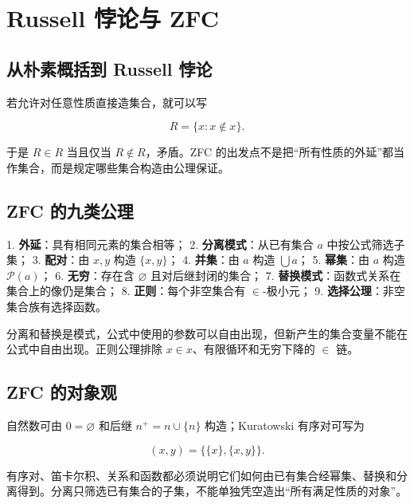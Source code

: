 \section{Russell 悖论与 ZFC}


\subsection{从朴素概括到 Russell 悖论}


若允许对任意性质直接造集合，就可以写

\[
R=\{x:x\notin x\}.
\]

于是 $R\in R$ 当且仅当 $R\notin R$，矛盾。ZFC 的出发点不是把“所有性质的外延”都当作集合，而是规定哪些集合构造由公理保证。

\subsection{ZFC 的九类公理}


1. \textbf{外延}：具有相同元素的集合相等；
2. \textbf{分离模式}：从已有集合 $a$ 中按公式筛选子集；
3. \textbf{配对}：由 $x,y$ 构造 $\{x,y\}$；
4. \textbf{并集}：由 $a$ 构造 $\bigcup a$；
5. \textbf{幂集}：由 $a$ 构造 $\mathcal P(a)$；
6. \textbf{无穷}：存在含 $\varnothing$ 且对后继封闭的集合；
7. \textbf{替换模式}：函数式关系在集合上的像仍是集合；
8. \textbf{正则}：每个非空集合有 $\in$-极小元；
9. \textbf{选择公理}：非空集合族有选择函数。

分离和替换是模式，公式中使用的参数可以自由出现，但新产生的集合变量不能在公式中自由出现。正则公理排除 $x\in x$、有限循环和无穷下降的 $\in$ 链。

\subsection{ZFC 的对象观}


自然数可由 $0=\varnothing$ 和后继 $n^+=n\cup\{n\}$ 构造；Kuratowski 有序对可写为

\[
(x,y)=\{\{x\},\{x,y\}\}.
\]

有序对、笛卡尔积、关系和函数都必须说明它们如何由已有集合经幂集、替换和分离得到。分离只筛选已有集合的子集，不能单独凭空造出“所有满足性质的对象”。

